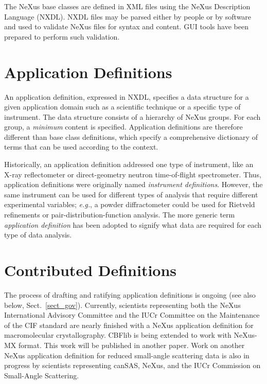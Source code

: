 \documentclass[%
 aip,
rsi,
 amsmath,amssymb,
 reprint,%
]{revtex4-1}
\begin{document}
The NeXus base classes are defined in XML files using the NeXus Description Language (NXDL)\cite{nxman}. 
NXDL files may be parsed either by people or by software and 
used to validate NeXus files for syntax and content.  GUI tools have been prepared\cite{nxvalidate} to 
perform such validation.%


\section{Application Definitions}
  \label{sect_appdef}

An application definition, expressed in NXDL, specifies a data structure
for a given application domain such as a scientific technique or a specific type of instrument.
The data structure consists of a hierarchy of NeXus groups.
For each group, a \emph{minimum} content is specified.
Application definitions are therefore different than
base class definitions, which specify a comprehensive 
dictionary of terms that can be used according to the context.

Historically, an application definition addressed one type of instrument,
like an X-ray reflectometer or direct-geometry neutron time-of-flight spectrometer.
Thus, application definitions were originally named \emph{instrument definitions}.
However, the same instrument can be used for different types of analysis that require different
experimental variables; \emph{e.g.}, a powder diffractometer could be used for Rietveld 
refinements or pair-distribution-function analysis. The more generic term \emph{application definition} has 
been adopted to signify what data are required for each type of data analysis.

\section{Contributed Definitions}
  \label{sect_contribdef}

The process of drafting and ratifying application definitions
is ongoing (see also below, Sect.~\ref{sect_gov}).
Currently, scientists representing both
the NeXus International Advisory Committee and the IUCr Committee on the Maintenance
of the CIF standard 
are nearly finished with a NeXus application definition for macromolecular crystallography.
CBFlib\cite{cbflib} is being extended to work with NeXus-MX format. This work will be published in another paper. 
Work on another NeXus application definition for reduced small-angle scattering data
is also in progress\cite{cansas}  by scientists representing
canSAS, NeXus, and the IUCr Commission on Small-Angle Scattering.
\end{document}

